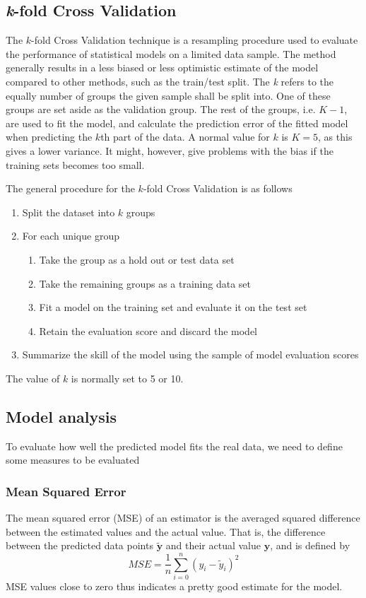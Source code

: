 \documentclass{article}
\begin{document}
\subsection{\textit{k}-fold Cross Validation}
The $k$-fold Cross Validation technique is a resampling procedure used to evaluate the performance of statistical models on a limited data sample. The method generally results in a less biased or less optimistic estimate of the model compared to other methods, such as the train/test split. The \textit{k} refers to the equally number of groups the given sample shall be split into. One of these groups are set aside as the validation group. The rest of the groups, i.e. $K-1$, are used to fit the model, and calculate the prediction error of the fitted model when predicting the $k$th part of the data. A normal value for $k$ is $K=5$, as this gives a lower variance. It might, however, give problems with the bias if the training sets becomes too small.

The general procedure for the $k$-fold Cross Validation is as follows
\begin{enumerate}
\item Split the dataset into $k$ groups
\item For each unique group
\begin{enumerate}
\item Take the group as a hold out or test data set
\item Take the remaining groups as a training data set
\item Fit a model on the training set and evaluate it on the test set
\item Retain the evaluation score and discard the model
\end{enumerate}
\item Summarize the skill of the model using the sample of model evaluation scores
\end{enumerate}
The value of $k$ is normally set to 5 or 10.

\subsection{Model analysis}
To evaluate how well the predicted model fits the real data, we need to define some measures to be evaluated
\subsubsection{Mean Squared Error}
The mean squared error (MSE) of an estimator is the averaged squared difference between the estimated values and the actual value. That is, the difference between the predicted data points $\tilde{\textbf{y}}$ and their actual value $\textbf{y}$, and is defined by
\begin{equation}\label{MSE}
MSE = \frac{1}{n} \sum_{i=0}^{n}(y_{i} - \tilde{y}_{i})^{2}
\end{equation}
MSE values close to zero thus indicates a pretty good estimate for the model.
\end{document}
